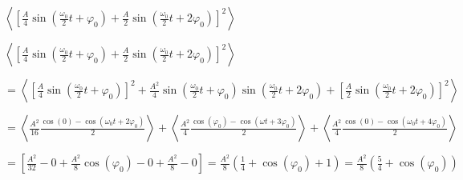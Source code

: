 

\begin{enonce}
$\left<\left[\frac{A}{4}\sin\left(\frac{\omega_0}{2} t + \varphi_0\right) + \frac{A}{2}\sin\left(\frac{\omega_0}{2} t + 2\varphi_0\right)\right]^2\right>$
\end{enonce}
			
			
\begin{corrige}
	$\left<\left[\frac{A}{4}\sin\left(\frac{\omega_0}{2} t + \varphi_0\right) + \frac{A}{2}\sin\left(\frac{\omega_0}{2} t + 2\varphi_0\right)\right]^2\right>$
	
	$=\left<\left[\frac{A}{4}\sin(\frac{\omega_0}{2} t + \varphi_0)\right]^2 + \frac{A^2}{4} \sin(\frac{\omega_0}{2} t + \varphi_0) \sin(\frac{\omega_0}{2} t + 2\varphi_0) + \left[\frac{A}{2} \sin(\frac{\omega_0}{2} t + 2\varphi_0)\right]^2 \right>$

	$=\left<\frac{A^2}{16} \frac{\cos(0)-\cos(\omega_0 t + 2\varphi_0)}{2}\right> + \left< \frac{A^2}{4} \frac{\cos(\varphi_0)-\cos(\omega t +3\varphi_0)}{2}\right> + \left<\frac{A^2}{4} \frac{\cos(0)-\cos(\omega_0 t + 4\varphi_0)}{2}\right>$

	$=\left[\frac{A^2}{32}-0+\frac{A^2}{8}\cos(\varphi_0)-0+\frac{A^2}{8}-0 \right]=\frac{A^2}{8} \left(\frac{1}{4}+\cos(\varphi_0)+1\right)=\frac{A^2}{8} \left(\frac{5}{4}+\cos(\varphi_0)\right)$
\end{corrige}
		

\finEntrainement







\hauteurLargeurCadreReponse		{6mm}{5cm}
\initialisationEntrainement


